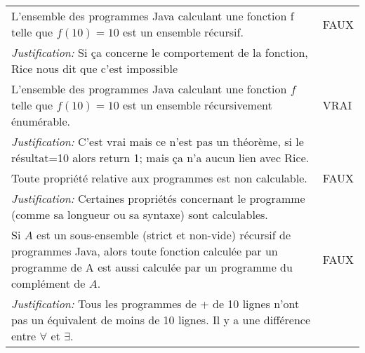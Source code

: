 \begin{longtable}{p{13cm}|l}
    L'ensemble des programmes Java calculant une fonction f telle que $f(10)=10$ est un ensemble récursif. & FAUX \\
    \textit{Justification:} Si ça concerne le comportement de la fonction, Rice nous dit que c'est impossible & \\ \hline
    L'ensemble des programmes Java calculant une fonction $f$ telle que $f(10) = 10$ est un ensemble récursivement énumérable. & VRAI \\
    \textit{Justification:} C'est vrai mais ce n'est pas un théorème, si le résultat=10 alors return 1; mais ça n'a aucun lien avec Rice. & \\ \hline
    Toute propriété relative aux programmes est non calculable. & FAUX \\
    \textit{Justification:} Certaines propriétés concernant le programme (comme sa longueur ou sa syntaxe) sont calculables. & \\ \hline
    Si $A$ est un sous-ensemble (strict et non-vide) récursif de programmes Java, alors toute fonction calculée par un programme de A est aussi calculée par un programme du complément de $A$. & FAUX \\
    \textit{Justification:} Tous les programmes de + de 10 lignes n'ont pas un équivalent de moins de 10 lignes. Il y a une différence entre $\forall$ et $\exists$. & \\
\end{longtable}